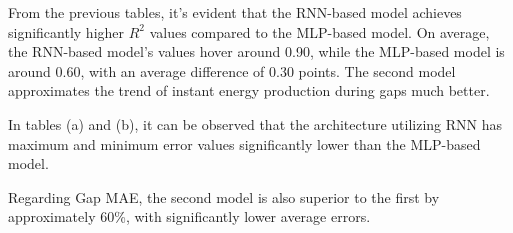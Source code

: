From the previous tables, it's evident that the RNN-based model achieves significantly higher $R^2$ values compared to the MLP-based model. On average, the RNN-based model's values hover around 0.90, while the MLP-based model is around 0.60, with an average difference of 0.30 points. The second model approximates the trend of instant energy production during gaps much better.

In tables (a) and (b), it can be observed that the architecture utilizing RNN has maximum and minimum error values significantly lower than the MLP-based model.

Regarding Gap MAE, the second model is also superior to the first by approximately 60\%, with significantly lower average errors.


